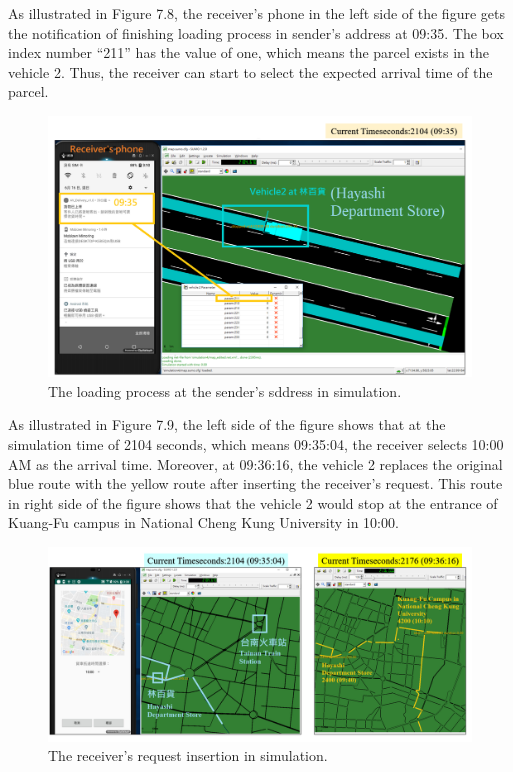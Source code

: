 \documentclass[12pt]{ksthesis}
\begin{document}
\begin{thesis}
{As illustrated in Figure 7.8, the receiver’s phone in the left side of the figure gets the notification of finishing loading process in sender’s address at 09:35. The box index number “211” has the value of one, which means the parcel exists in the vehicle 2. Thus, the receiver can start to select the expected arrival time of the parcel.

\begin{figure}[H]
\centering
\includegraphics[width=1.12\textwidth]{./Thesis_figures/F7-8_loadingProcess.PNG}
\caption{\large The loading process at the sender’s sddress in simulation.}
\vspace{0.5cm}
\label{Fig:LoadingProcess}
\end{figure}


As illustrated in Figure 7.9, the left side of the figure shows that at the simulation time of 2104 seconds, which means 09:35:04, the receiver selects 10:00 AM as the arrival time. 
Moreover, at 09:36:16, the vehicle 2 replaces the original blue route with the yellow route after inserting the receiver’s request. This route in right side of the figure shows that the vehicle 2 would stop at the entrance of Kuang-Fu campus in National Cheng Kung University in 10:00.

\begin{figure}[H]
\centering
\includegraphics[width=1.12\textwidth]{./Thesis_figures/F7-9_receiverRequest.PNG}
\caption{\large The receiver’s request insertion in simulation.}
\vspace{0.5cm}


\end{figure}}
\end{thesis}
\end{document}
